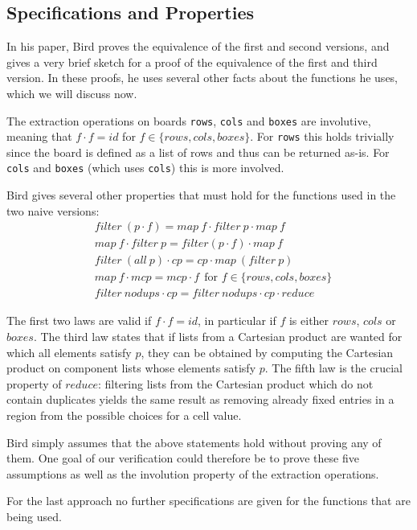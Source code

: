 \documentclass[a4paper,11pt]{article}
\begin{document}
\subsection{Specifications and Properties}
In his paper, Bird proves the equivalence of the first and second versions, and gives a very brief sketch for a proof of the equivalence of the first and third version. In these proofs, he uses several other facts about the functions he uses, which we will discuss now.
 
The extraction operations on boards \texttt{rows}, \texttt{cols} and \texttt{boxes} are involutive, meaning that \(f \cdot f = id\) for \(f \in \{rows,cols,boxes\}\). For \texttt{rows} this holds trivially since the board is defined as a list of rows and thus can be returned as-is. For \texttt{cols} and \texttt{boxes} (which uses \texttt{cols}) this is more involved. 

Bird gives several other properties that must hold for the functions used in the two naive versions:
\begin{align}
  &filter~(p \cdot f) = map~f \cdot filter~p \cdot map~f\\
  &map~f \cdot filter~p = filter (p \cdot f ) \cdot map~f\\
  &filter~(all~p) \cdot cp = cp \cdot map~(filter~p)\\
  &map~f \cdot mcp = mcp \cdot f~~\text{for \(f \in \{rows,cols,boxes\}\)}\\
  &filter~nodups \cdot cp = filter~nodups \cdot cp \cdot reduce
\end{align}

The first two laws are valid if \(f \cdot f = id\), in particular if \(f\) is either \(rows\), \(cols\) or \(boxes\).
The third law states that if lists from a Cartesian product are wanted for which all elements satisfy \(p\), they can be obtained by computing the Cartesian product on component lists whose elements satisfy \(p\).
The fifth law is the crucial property of \(reduce\): filtering lists from the Cartesian product which do not contain duplicates yields the same result as removing already fixed entries in a region from the possible choices for a cell value. 

Bird simply assumes that the above statements hold without proving any of them. One goal of our verification could therefore be to prove these five assumptions as well as the involution property of the extraction operations.

For the last approach no further specifications are given for the functions that are being used. 
\end{document}
